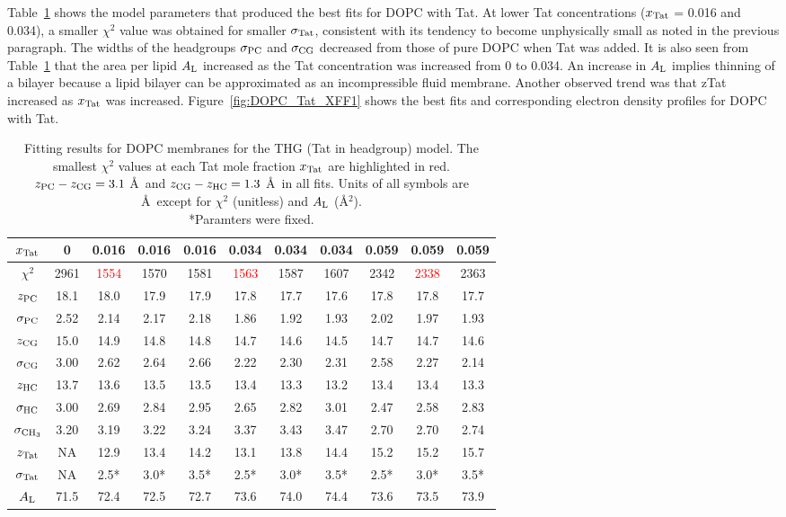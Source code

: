 Table~\ref{tab:DOPC_fit_results} shows the model parameters that produced
the best fits for DOPC with Tat.
At lower Tat concentrations ($x_\textrm{Tat}$ = 0.016 and 0.034), 
a smaller $\chi^2$ value was obtained for smaller $\sigma_\textrm{Tat}$,
consistent with its tendency to become unphysically small as noted 
in the previous paragraph. The widths of the headgroups $\sigma_\textrm{PC}$ and
$\sigma_\textrm{CG}$ decreased from those of pure DOPC when Tat was added.  
It is also seen from Table~\ref{tab:DOPC_fit_results} 
that the area per lipid $A_\textrm{L}$ increased as the Tat concentration was
increased from 0 to 0.034. An increase in $A_\textrm{L}$ implies thinning of a bilayer because
a lipid bilayer can be approximated as an incompressible fluid membrane. 
Another observed trend was that \gls{zTat} increased as $x_\textrm{Tat}$ was increased.
Figure~\ref{fig:DOPC_Tat_XFF1} shows the best fits and corresponding 
electron density profiles for DOPC with Tat.

\begin{table}[htbp]
  \centering
  \begin{tabular}{c|c|ccc|ccc|ccc}
    \hline
    $x_\textrm{Tat}$ & 0 & 0.016 & 0.016 & 0.016 & 0.034 & 0.034 & 0.034 & 0.059 & 0.059 & 0.059 \\
    \hline
    $\chi^2$ & 2961 & \textcolor{red}{1554} & 1570 & 1581 & \textcolor{red}{1563} & 1587 & 1607 & 2342 & \textcolor{red}{2338} & 2363 \\ 
    $z_\textrm{PC}$ & 18.1 & 18.0 & 17.9 & 17.9 & 17.8 & 17.7 & 17.6 & 17.8 & 17.8 & 17.7 \\
    $\sigma_\textrm{PC}$ & 2.52 & 2.14 & 2.17 & 2.18 & 1.86 & 1.92 & 1.93 & 2.02 & 1.97 & 1.93 \\
    $z_\textrm{CG}$ & 15.0 & 14.9 & 14.8 & 14.8 & 14.7 & 14.6 & 14.5 & 14.7 & 14.7 & 14.6 \\
    $\sigma_\textrm{CG}$ & 3.00 & 2.62 & 2.64 & 2.66 & 2.22 & 2.30 & 2.31 & 2.58 & 2.27 & 2.14 \\
    $z_\textrm{HC}$ & 13.7 & 13.6 & 13.5 & 13.5 & 13.4 & 13.3 & 13.2 & 13.4 & 13.4 & 13.3 \\ 
    $\sigma_\textrm{HC}$ & 3.00 & 2.69 & 2.84 & 2.95 & 2.65 & 2.82 & 3.01 & 2.47 & 2.58 & 2.83 \\
    $\sigma_{\textrm{CH}_3}$ & 3.20 & 3.19 & 3.22 & 3.24 & 3.37 & 3.43 & 3.47 & 2.70 & 2.70 & 2.74 \\
    $z_\textrm{Tat}$ & NA & 12.9 & 13.4 & 14.2 & 13.1 & 13.8 & 14.4 & 15.2 & 15.2 & 15.7 \\
    $\sigma_\textrm{Tat}$ & NA & 2.5* & 3.0* & 3.5* & 2.5* & 3.0* & 3.5* & 2.5* & 3.0* & 3.5* \\ 
    $A_\textrm{L}$ & 71.5 & 72.4 & 72.5 & 72.7 & 73.6 & 74.0 & 74.4 & 73.6 & 73.5 & 73.9 \\
    \hline
  \end{tabular}
  \caption[Fitting results for DOPC membranes for the THG (Tat in headgroup) model]
  {Fitting results for DOPC membranes for the THG (Tat in headgroup) model. 
  The smallest $\chi^2$ values at each Tat mole fraction $x_\textrm{Tat}$ are highlighted in red.  
  $z_\textrm{PC}-z_\textrm{CG} = 3.1$ \AA\
  and $z_\textrm{CG}-z_\textrm{HC} = 1.3$ \AA\ in all fits.
  Units of all symbols are \AA\ except for $\chi^2$ (unitless) and $A_\textrm{L}$ (\AA$^2$).  
  \\
  *Paramters were fixed.}
  \label{tab:DOPC_fit_results}
\end{table}


